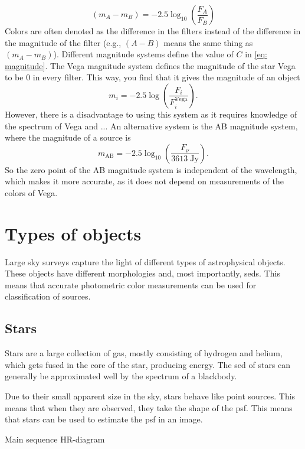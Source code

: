 \begin{equation}
    (m_A-m_B)=-2.5\log_{10}\left(\frac{F_A}{F_B}\right)
\end{equation}
Colors are often denoted as the difference in the filters instead of the difference in the magnitude of the filter (e.g., $(A-B)$ means the same thing as $(m_A-m_B)$). Different magnitude systems define the value of $C$ in \autoref{eq: magnitude}. The Vega magnitude system defines the magnitude of the star Vega to be 0 in every filter. This way, you find that it gives the magnitude of an object
\begin{equation}
    m_i=-2.5\log\left(\frac{F_i}{F_i^\mathrm{Vega}}\right).
\end{equation}
However, there is a disadvantage to using this system as it requires knowledge of the spectrum of Vega and ...
An alternative system is the AB magnitude system, where the magnitude of a source is
\begin{equation}\label{eq: magnitude ab}
    m_\mathrm{AB}=-2.5\log_{10}\left(\frac{F_\nu}{3613 \mathrm{\;Jy}}\right).
\end{equation}
So the zero point of the AB magnitude system is independent of the wavelength, which makes it more accurate, as it does not depend on measurements of the colors of Vega. 

\section{Types of objects}
Large sky surveys capture the light of different types of astrophysical objects. These objects have different morphologies and, most importantly, \glspl{sed}. This means that accurate photometric color measurements can be used for classification of sources.  

\subsection{Stars}
Stars are a large collection of gas, mostly consisting of hydrogen and helium, which gets fused in the core of the star, producing energy. The \gls{sed} of stars can generally be approximated well by the spectrum of a blackbody. 

Due to their small apparent size in the sky, stars behave like point sources. This means that when they are observed, they take the shape of the \gls{psf}. This means that stars can be used to estimate the \gls{psf} in an image. 

Main sequence
HR-diagram

